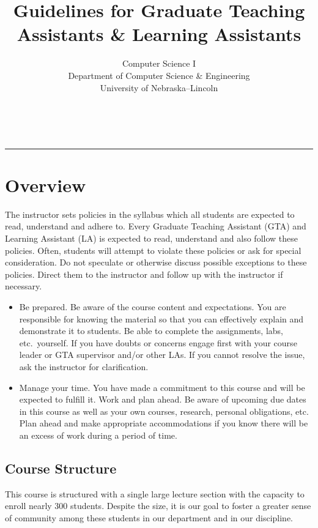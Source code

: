 \documentclass[12pt]{scrartcl}
\title{Guidelines for Graduate Teaching Assistants \& Learning Assistants}\let\Title\@title
\subtitle{Computer Science I\\
{\small
\vskip1cm
Department of Computer Science \& Engineering \\
University of Nebraska--Lincoln}
\vskip-1cm}
\date{~}
\begin{document}
\maketitle


\hrule

\section*{Overview}

The instructor sets policies in the syllabus which all students 
are expected to read, understand and adhere to. Every Graduate 
Teaching Assistant (GTA) and Learning Assistant (LA) is expected 
to read, understand and also follow these policies.  Often, 
students will attempt to violate these policies or ask for special 
consideration.  Do not speculate or otherwise discuss possible 
exceptions to these policies.  Direct them to the instructor 
and follow up with the instructor if necessary.

\begin{itemize}
  \item Be prepared.  Be aware of the course content and expectations.
  You are responsible for knowing the material so that you can effectively
  explain and demonstrate it to students.  Be able to complete the assignments, 
  labs, etc.\ yourself.  If you have doubts or concerns engage first with
  your course leader or GTA supervisor and/or other LAs.  If you cannot
  resolve the issue, ask the instructor for clarification.
  \item Manage your time.  You have made a commitment to this course and
  will be expected to fulfill it.  Work and plan ahead.  Be aware of 
  upcoming due dates in this course as well as your own courses, research, 
  personal obligations, etc.  Plan ahead and make appropriate accommodations 
  if you know there will be an excess of work during a period of time.
\end{itemize}

\subsection*{Course Structure}

This course is structured with a single large lecture section with the
capacity to enroll nearly 300 students.  Despite the size, it is our 
goal to foster a greater sense of community among these students in 
our department and in our discipline.  
\end{document}
